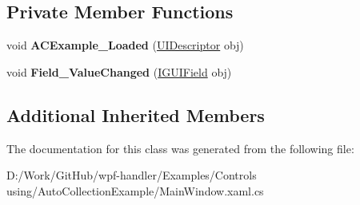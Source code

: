 \subsection*{Private Member Functions}
\begin{DoxyCompactItemize}
\item 
\mbox{\label{class_auto_collection_example_1_1_a_c_example_a5fbfdaf20bf588561a69e10d3a1e7145}} 
void {\bfseries A\+C\+Example\+\_\+\+Loaded} (\mbox{\hyperlink{class_wpf_handler_1_1_u_i_1_1_auto_layout_1_1_u_i_descriptor}{U\+I\+Descriptor}} obj)
\item 
\mbox{\label{class_auto_collection_example_1_1_a_c_example_a5cf978933709839fe837b06a43732dab}} 
void {\bfseries Field\+\_\+\+Value\+Changed} (\mbox{\hyperlink{interface_wpf_handler_1_1_u_i_1_1_auto_layout_1_1_i_g_u_i_field}{I\+G\+U\+I\+Field}} obj)
\end{DoxyCompactItemize}
\subsection*{Additional Inherited Members}


The documentation for this class was generated from the following file\+:\begin{DoxyCompactItemize}
\item 
D\+:/\+Work/\+Git\+Hub/wpf-\/handler/\+Examples/\+Controls using/\+Auto\+Collection\+Example/Main\+Window.\+xaml.\+cs\end{DoxyCompactItemize}
